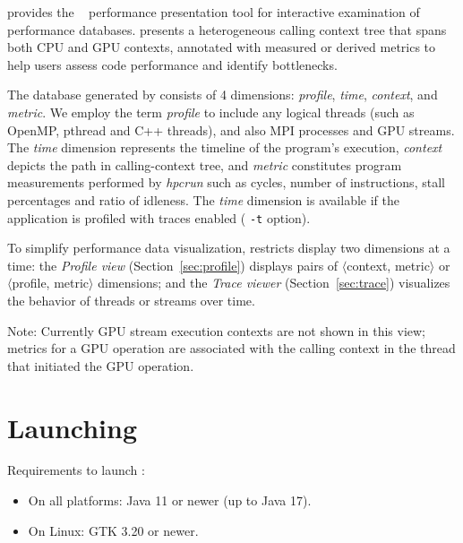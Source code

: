 

\HPCToolkit{} provides the \hpcviewer{}~\cite{Adhianto-MC-Ta:2010:PSTI-hpcviewer,Tallent-MC-etal:2011:ICS-hpctoolkit-scalable-tracing} performance presentation tool for interactive examination of performance databases.
\hpcviewer{}  presents a heterogeneous
calling context tree that spans both CPU and GPU contexts, annotated
with measured or derived metrics to help users assess code performance
and identify bottlenecks.

The database generated by \hpcprof{} consists of 4 dimensions: \emph{profile}, \emph{time}, \emph{context}, and \emph{metric}.
We employ the term \emph{profile} to include any logical threads (such as OpenMP, pthread and C++ threads), and also MPI processes and GPU streams.
The \emph{time} dimension represents the timeline of the program's execution, \emph{context} depicts the path in calling-context tree, and \emph{metric} constitutes program measurements performed by \textit{hpcrun} such as cycles, number of instructions, stall percentages and ratio of idleness.
The \emph{time} dimension is available if the application is profiled with traces enabled (\hpcrun{} \texttt{-t} option).


To simplify performance data visualization, \hpcviewer{} restricts
display two dimensions at a time: the \emph{Profile view} (Section~\ref{sec:profile}) displays
pairs of $\langle$context, metric$\rangle$ or $\langle$profile,
metric$\rangle$ dimensions; and the \emph{Trace viewer} (Section~\ref{sec:trace}) visualizes the
behavior of threads or streams over time.

Note: Currently GPU stream execution contexts are not shown in this view; metrics for a GPU operation are associated with the calling context in the thread that initiated the GPU operation.


\section{Launching}

Requirements to launch \hpcviewer:
\begin{itemize}
 \item On all platforms: Java 11 or newer (up to Java 17).
 \item On Linux: GTK 3.20 or newer.
\end{itemize}

